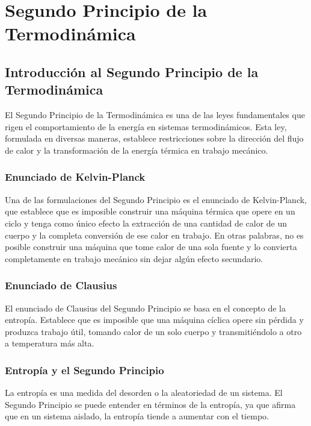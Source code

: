 \documentclass[../main]{subfiles}
\begin{document}
\chapter{Segundo Principio de la Termodinámica}

\section{Introducción al Segundo Principio de la Termodinámica}

El Segundo Principio de la Termodinámica es una de las leyes fundamentales que rigen el comportamiento de la energía en sistemas termodinámicos. Esta ley, formulada en diversas maneras, establece restricciones sobre la dirección del flujo de calor y la transformación de la energía térmica en trabajo mecánico.

\subsection{Enunciado de Kelvin-Planck}

Una de las formulaciones del Segundo Principio es el enunciado de Kelvin-Planck, que establece que es imposible construir una máquina térmica que opere en un ciclo y tenga como único efecto la extracción de una cantidad de calor de un cuerpo y la completa conversión de ese calor en trabajo. En otras palabras, no es posible construir una máquina que tome calor de una sola fuente y lo convierta completamente en trabajo mecánico sin dejar algún efecto secundario.

\subsection{Enunciado de Clausius}

El enunciado de Clausius del Segundo Principio se basa en el concepto de la entropía. Establece que es imposible que una máquina cíclica opere sin pérdida y produzca trabajo útil, tomando calor de un solo cuerpo y transmitiéndolo a otro a temperatura más alta.

\subsection{Entropía y el Segundo Principio}

La entropía es una medida del desorden o la aleatoriedad de un sistema. El Segundo Principio se puede entender en términos de la entropía, ya que afirma que en un sistema aislado, la entropía tiende a aumentar con el tiempo.
\end{document}
